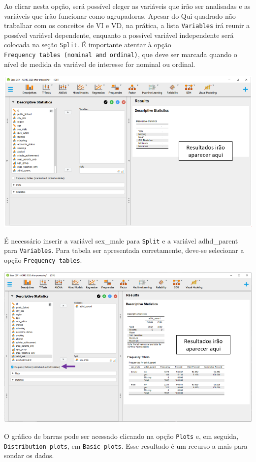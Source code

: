 \documentclass[
]{book}
\begin{document}
Ao clicar nesta opção, será possível eleger as variáveis que irão ser analisadas e as variáveis que irão funcionar como agrupadoras. Apesar do Qui-quadrado não trabalhar com os conceitos de VI e VD, na prática, a lista \texttt{Variables} irá reunir a possível variável dependente, enquanto a possível variável independente será colocada na seção \texttt{Split}. É importante atentar à opção \texttt{Frequency\ tables\ (nominal\ and\ ordinal)}, que deve ser marcada quando o nível de medida da variável de interesse for nominal ou ordinal.

\includegraphics{./img/cap_x2_primeira_tabela.png}

É necessário inserir a variável sex\_male para \texttt{Split} e a variável adhd\_parent para \texttt{Variables}. Para tabela ser apresentada corretamente, deve-se selecionar a opção \texttt{Frequency\ tables}.

\includegraphics{./img/cap_x2_descritivo.png}

O gráfico de barras pode ser acessado clicando na opção \texttt{Plots} e, em seguida, \texttt{Distribution\ plots}, em \texttt{Basic\ plots}. Esse resultado é um recurso a mais para sondar os dados.
\end{document}
